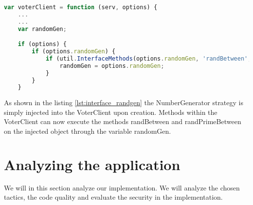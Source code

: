 \begin{lstlisting}[language=Javascript, caption=Checking for an interface, label=lst:interface_randgen]
var voterClient = function (serv, options) {
    ...
    ...
    var randomGen;                     

    if (options) {
        if (options.randomGen) {
            if (util.InterfaceMethods(options.randomGen, 'randBetween', 'randPrimeBetween')) {
                randomGen = options.randomGen;
            }
        }
    } 
\end{lstlisting}
 
\noindent
As shown in the listing \ref{lst:interface_randgen} the NumberGenerator strategy is simply injected
into the VoterClient upon creation. Methods within the VoterClient can now execute the methods
randBetween and randPrimeBetween on the injected object through the variable randomGen. 
 
 


\section{Analyzing the application}
We will in this section analyze our implementation. We will analyze the chosen tactics, the code quality and evaluate the security in the implementation. 

